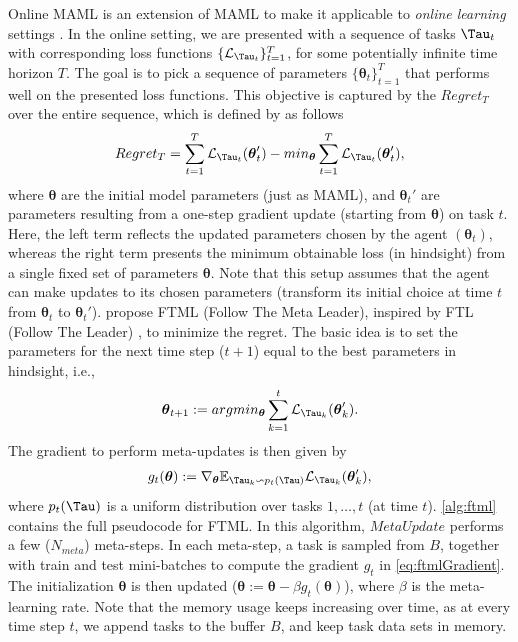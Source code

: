 Online MAML  is an extension of MAML  to make it applicable to \textit{online learning} settings . In the online setting, we are presented with a sequence of tasks $\Tau_{t}$ with corresponding loss functions $\{ \mathcal{L}_{\Tau_{t}} \}_{t=1}^{T}$, for some potentially infinite time horizon $T$. The goal is to pick a sequence of parameters $\{ \boldsymbol{\theta}_{t} \}_{t=1}^{T}$ that performs well on the presented loss functions. This objective is captured by the $Regret_{T}$ over the entire sequence, which is defined by  as follows
\begin{align}
    Regret_{T} = \sum_{t=1}^{T}\mathcal{L}_{\Tau_{t}}(\boldsymbol{\theta}_{t}') - min_{\boldsymbol{\theta}} \sum_{t=1}^{T}\mathcal{L}_{\Tau_{t}}(\boldsymbol{\theta}'_{t}),
\end{align} where $\boldsymbol{\theta}$ are the initial model parameters (just as MAML), and $\boldsymbol{\theta}_{t}'$ are parameters resulting from a one-step gradient update (starting from $\boldsymbol{\theta}$) on task $t$. Here, the left term reflects the updated parameters chosen by the agent $(\boldsymbol{\theta}_{t})$, whereas the right term presents the minimum obtainable loss (in hindsight) from a single fixed set of parameters $\boldsymbol{\theta}$. Note that this setup assumes that the agent can make updates to its chosen parameters (transform its initial choice at time $t$ from $\boldsymbol{\theta}_{t}$ to $\boldsymbol{\theta}_{t}'$).
 propose FTML (Follow The Meta Leader), inspired by FTL (Follow The Leader) , to minimize the regret. The basic idea is to set the parameters for the next time step ($t+1$) equal to the best parameters in hindsight, i.e.,
\begin{align}
    \boldsymbol{\theta}_{t+1} := argmin_{\boldsymbol{\theta}} \sum_{k=1}^{t}\mathcal{L}_{\Tau_{k}}(\boldsymbol{\theta}_{k}').\label{eq:ftmlGradient} 
\end{align} The gradient to perform meta-updates is then given by 
\begin{align}
    g_{t}(\boldsymbol{\theta}) := \nabla_{\boldsymbol{\theta}} \mathbb{E}_{\Tau_{k} \backsim p_{t}(\Tau)} \mathcal{L}_{\Tau_{k}}(\boldsymbol{\theta}_{k}'),
\end{align} where $p_{t}(\Tau)$ is a uniform distribution over tasks $1,\ldots ,t$ (at time $t$).
\autoref{alg:ftml} contains the full pseudocode for FTML. In this algorithm, $\mathit{MetaUpdate}$ performs a few ($N_{meta}$) meta-steps. In each meta-step, a task is sampled from $B$, together with train and test mini-batches to compute the gradient $g_{t}$ in \autoref{eq:ftmlGradient}. The initialization $\boldsymbol{\theta}$ is then updated ($\boldsymbol{\theta} := \boldsymbol{\theta} - \beta g_{t}(\boldsymbol{\theta})$), where $\beta$ is the meta-learning rate. Note that the memory usage keeps increasing over time, as at every time step $t$, we append tasks to the buffer $B$, and keep task data sets in memory.  
